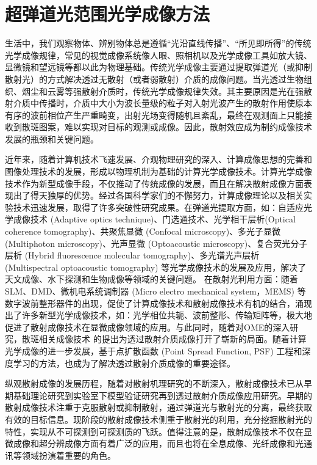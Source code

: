 
\chapter{超弹道光范围光学成像方法}\label{chap:2}
生活中，我们观察物体、辨别物体总是遵循“光沿直线传播”、“所见即所得”的传统光学成像规律，常见的视觉成像系统像人眼、照相机以及光学成像工具如放大镜、显微镜和望远镜等都以此为物理基础。传统光学成像主要通过提取弹道光（或抑制散射光）的方式解决透过无散射（或者弱散射）介质的成像问题。当光透过生物组织、烟尘和云雾等强散射介质时，传统光学成像规律失效。其主要原因是光在强散射介质中传播时，介质中大小为波长量级的粒子对入射光波产生的散射作用使原本有序的波前相位产生严重畸变，出射光场变得随机且紊乱，最终在观测面上只能接收到散斑图案，难以实现对目标的观测或成像。因此，散射效应成为制约成像技术发展的瓶颈和关键问题。

近年来，随着计算机技术飞速发展、介观物理研究的深入、计算成像思想的完善和图像处理技术的发展，形成以物理机制为基础的计算光学成像技术。计算光学成像技术作为新型成像手段，不仅推动了传统成像的发展，而且在解决散射成像方面表现出了得天独厚的优势。经过各国科学家们的不懈努力，计算成像理论以及相关实验技术迅速发展，取得了许多突破性研究成果。在弹道光提取方面，如：自适应光学成像技术 (Adaptive optics technique)、门选通技术、光学相干层析(Optical coherence tomography)\cite{huang_optical_1991}、共聚焦显微 (Confocal microscopy)\cite{webb_confocal_1996}、多光子显微 (Multiphoton microscopy)\cite{denk_two_photon_1990,helmchen_deep_2005}、光声显微 (Optoacoustic microscopy)\cite{zhang_functional_2006,wang_multiscale_2009}、复合荧光分子层析 (Hybrid fluorescence molecular tomography)\cite{ale_fmt_xct_2012}、多光谱光声层析 (Multispectral optoacoustic tomography)\cite{razansky_volumetric_2011,ntziachristos_going_2010} 等光学成像技术的发展及应用，解决了天文成像、水下探测和生物成像等领域的关键问题。
在散射光利用方面：随着SLM、DMD、微机电系统调制器 (Micro electro mechanical system，MEMS) 等数字波前整形器件的出现，促使了计算成像技术和散射成像技术有机的结合，涌现出了许多新型光学成像技术，如：光学相位共轭\cite{yaqoob_optical_2008}、波前整形\cite{Vellekoop2007,vellekoop_exploiting_2010,conkey_genetic_2012,blochet_fast_2017}、传输矩阵\cite{Popoff2010}等，极大地促进了散射成像技术在显微成像领域的应用。与此同时，随着对OME\cite{Freund1988}的深入研究，散斑相关成像技术 的提出为透过散射介质成像打开了崭新的局面。随着计算光学成像的进一步发展，基于点扩散函数 (Point Spread Function, PSF) 工程\cite{sahoo_single-shot_2017}和深度学习\cite{li_deep_2018}的方法，也成为了解决透过散射介质成像的重要途径。

纵观散射成像的发展历程，随着对散射机理研究的不断深入，散射成像技术已从早期基础理论研究到实验室下模型验证研究再到透过散射介质成像应用研究。早期的散射成像技术注重于克服散射或抑制散射，通过弹道光与散射光的分离，最终获取有效的目标信息。现阶段的散射成像技术侧重于散射光的利用，充分挖掘散射光的特性，实现从不可探测到可探测质的飞跃。值得注意的是，散射成像技术不仅在显微成像和超分辨成像方面有着广泛的应用，而且也将在全息成像、光纤成像和光通讯等领域扮演着重要的角色。

